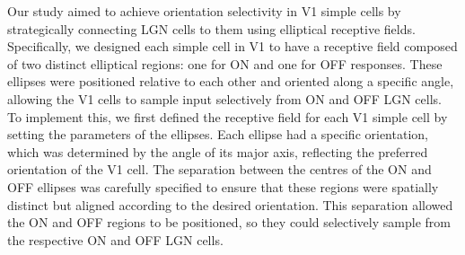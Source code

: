 \documentclass[12pt]{article}
\begin{document}
Our study aimed to achieve orientation selectivity in V1 simple cells by strategically connecting LGN cells to them using elliptical receptive fields. Specifically, we designed each simple cell in V1 to have a receptive field composed of two distinct elliptical regions: one for ON and one for OFF responses. These ellipses were positioned relative to each other and oriented along a specific angle, allowing the V1 cells to sample input selectively from ON and OFF LGN cells. To implement this, we first defined the receptive field for each V1 simple cell by setting the parameters of the ellipses. Each ellipse had a specific orientation, which was determined by the angle of its major axis, reflecting the preferred orientation of the V1 cell. The separation between the centres of the ON and OFF ellipses was carefully specified to ensure that these regions were spatially distinct but aligned according to the desired orientation. This separation allowed the ON and OFF regions to be positioned, so they could selectively sample from the respective ON and OFF LGN cells.
\bigbreak
\end{document}
